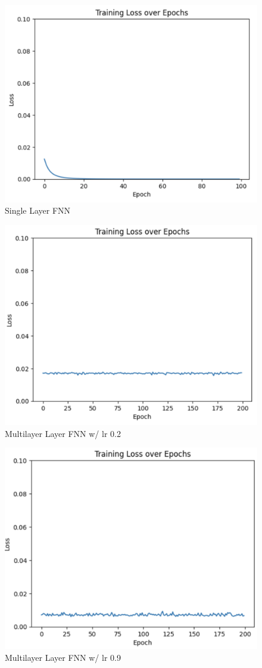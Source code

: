 \documentclass[12pt, a4paper]{article}
\begin{document}
\begin{itemize}
    \begin{figure}
        \centering
        \includegraphics[width=0.5\linewidth]{FNN/FromMingoo/Screenshot 2024-04-12 at 12.24.09 PM.png}
        \caption{Single Layer FNN}
        \label{fig:enter-label}
    \end{figure}
    \begin{figure}
        \centering
        \includegraphics[width=0.5\linewidth]{FNN/FromMingoo/Screenshot 2024-04-12 at 12.23.47 AM.png}
        \caption{Multilayer Layer FNN w/ lr 0.2}
        \label{fig:enter-label}
    \end{figure}
    \begin{figure}
        \centering
        \includegraphics[width=0.5\linewidth]{FNN/FromMingoo/Screenshot 2024-04-12 at 12.23.05 AM.png}
        \caption{Multilayer Layer FNN w/ lr 0.9}
        \label{fig:enter-label}
    \end{figure}
    \begin{figure}
        \centering

\end{figure}
\end{itemize}
\end{document}
